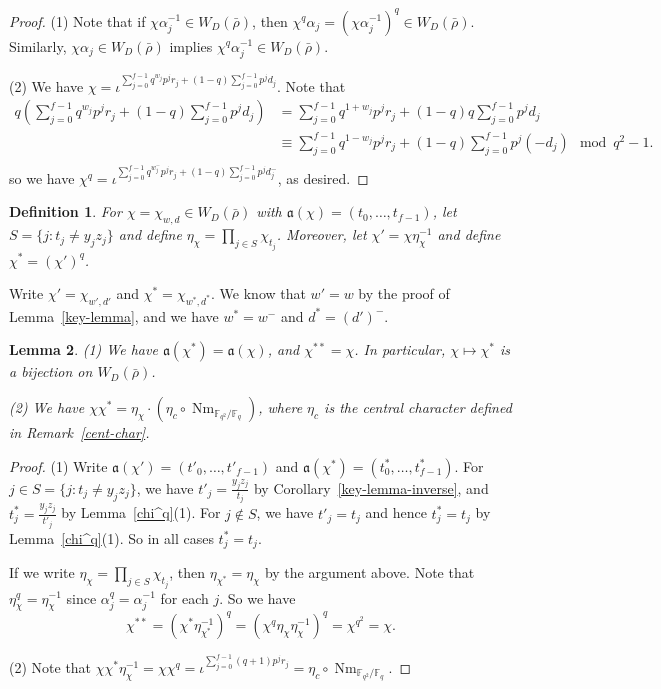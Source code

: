 \documentclass{article}
\newtheorem{definition}{Definition}[section]
\newtheorem{lemma}[definition]{Lemma}
\numberwithin{equation}{section}
\DeclareMathOperator{\Nm}{Nm}
\newcommand{\fa}{\mathfrak{a}}
\newcommand{\bF}{\mathbb{F}}
\begin{document}
\begin{proof}
    (1) Note that if $\chi\alpha_j^{-1}\in W_D(\bar{\rho})$, then 
     $\chi^q\alpha_j=(\chi\alpha_j^{-1})^q\in W_D(\bar{\rho})$. 
     Similarly, $\chi\alpha_j\in W_D(\bar{\rho})$ implies $\chi^q\alpha_j^{-1}\in W_D(\bar{\rho})$. 

     (2) We have $\chi=\iota^{\sum_{j=0}^{f-1}q^{w_j}p^jr_j+(1-q)\sum_{j=0}^{f-1}p^jd_j}$. 
     Note that 
     $$\begin{aligned}
        q(\sum_{j=0}^{f-1}q^{w_j}p^jr_j+(1-q)\sum_{j=0}^{f-1}p^jd_j)&={\sum_{j=0}^{f-1}q^{1+w_j}p^jr_j+(1-q)q\sum_{j=0}^{f-1}p^jd_j}\\
        &\equiv \sum_{j=0}^{f-1}q^{1-w_j}p^jr_j+(1-q)\sum_{j=0}^{f-1}p^j(-d_j)\mod q^2-1. \\
     \end{aligned}$$
     so we have $\chi^q=\iota^{\sum_{j=0}^{f-1}q^{w_j^-}p^jr_j+(1-q)\sum_{j=0}^{f-1}p^jd_j^-}$, as desired. 
\end{proof}

\begin{definition}
    For $\chi=\chi_{w,d}\in W_D(\bar{\rho})$ with $\fa(\chi)=(t_0,\ldots,t_{f-1})$, let $S=\{j:t_j\ne y_jz_j\}$ and 
    define $\eta_{\chi}=\prod_{j\in S}\chi_{t_j}$. 
    Moreover, let $\chi'=\chi\eta_{\chi}^{-1}$ and define $\chi^*=(\chi')^q$. 
\end{definition}

Write $\chi'=\chi_{w',d'}$ and $\chi^*=\chi_{w^*,d^*}$. We know that $w'=w$ by the proof of Lemma~\ref{key-lemma}, 
and we have $w^*=w^{-}$ and $d^*=(d')^-$. 

\begin{lemma}
    (1) We have $\fa(\chi^*)=\fa(\chi)$, and $\chi^{**}=\chi$. In particular, $\chi\mapsto\chi^*$ is a bijection on $W_D(\bar{\rho})$. 

    (2) We have $\chi\chi^*=\eta_\chi\cdot(\eta_c\circ \Nm_{\bF_{q^2}/\bF_q})$, where $\eta_c$ is the central character defined in Remark~\ref{cent-char}.
\end{lemma}

\begin{proof}
    (1) Write $\fa(\chi')=(t'_0,\ldots,t'_{f-1})$ and $\fa(\chi^*)=(t_0^*,\ldots,t_{f-1}^*)$. 
    For $j\in S=\{j:t_j\ne y_jz_j\}$, we have $t'_j=\frac{y_jz_j}{t_j}$ by Corollary~\ref{key-lemma-inverse}, 
    and $t_j^*=\frac{y_jz_j}{t'_j}$ by Lemma~\ref{chi^q}(1). 
    For $j\notin S$, we have $t'_j=t_j$ and hence $t_j^*=t_j$ by Lemma~\ref{chi^q}(1). So in all cases $t_j^*=t_j$. 

    If we write $\eta_{\chi}=\prod_{j\in S}\chi_{t_j}$, then 
    $\eta_{\chi^*}=\eta_\chi$ by the argument above. Note that $\eta_\chi^q=\eta_\chi^{-1}$ since $\alpha_j^q=\alpha_j^{-1}$ for each $j$. 
    So we have  
    $$\chi^{**}=(\chi^*\eta_{\chi^*}^{-1})^q=(\chi^q\eta_\chi\eta_\chi^{-1})^q=\chi^{q^2}=\chi.$$

    (2) Note that 
    $\chi\chi^*\eta_\chi^{-1}=\chi\chi^{q}=\iota^{\sum_{j=0}^{f-1}(q+1)p^jr_j}=\eta_c\circ \Nm_{\bF_{q^2}/\bF_q}$. 
\end{proof}
\end{document}

